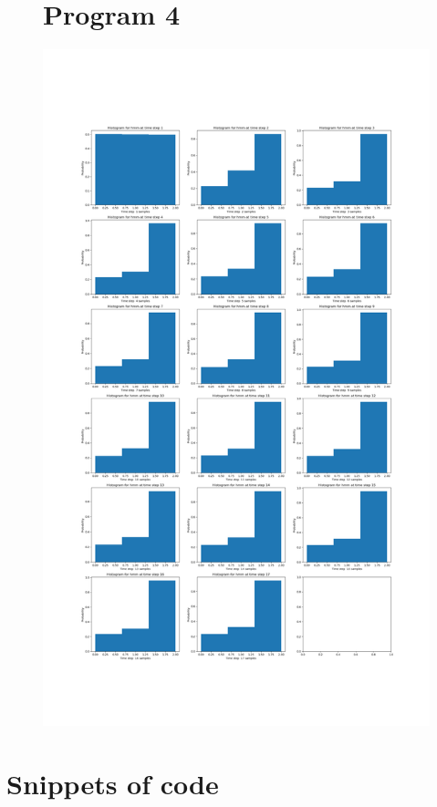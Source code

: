 \documentclass[12pt]{article}%
\theoremstyle{definition}
\begin{document}
	\begin{figure}[h]
	\section{Program 4}
	\includegraphics[scale=0.3]{program4_hist}
	\end{figure}
	
	
	\newpage
	
	\section{Snippets of code}
	
\end{document}
